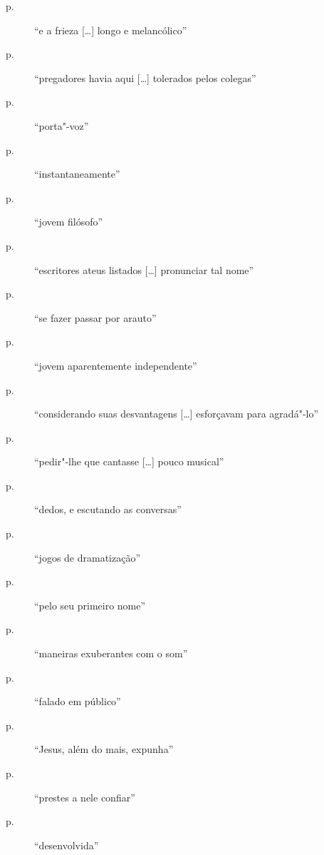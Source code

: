 \begin{description}
\item[p.~\pageref{e"-a}]  ``e a frieza [\ldots] longo e melancólico''

\item[p.~\pageref{pregadores"-havia}]  ``pregadores havia aqui [\ldots] tolerados pelos colegas''

\item[p.~\pageref{porta"-voz}]  ``porta"-voz''

\item[p.~\pageref{instantaneamente}]  ``instantaneamente''

\item[p.~\pageref{jovem"-filosofo}]  ``jovem filósofo''

\item[p.~\pageref{escritores"-ateus}]  ``escritores ateus listados [\ldots] pronunciar tal nome''

\item[p.~\pageref{se"-fazer}]  ``se fazer passar por arauto''

\item[p.~\pageref{jovem"-aparentemente}]  ``jovem aparentemente independente''

\item[p.~\pageref{considerando"-suas}]  ``considerando suas desvantagens [\ldots] esforçavam para agradá"-lo''

\item[p.~\pageref{pedir"-lhe"-que}]  ``pedir"-lhe que cantasse [\ldots] pouco musical''

\item[p.~\pageref{dedos"-e}]  ``dedos, e escutando as conversas''

\item[p.~\pageref{jogos"-de}]  ``jogos de dramatização''

\item[p.~\pageref{pelo"-seu}]  ``pelo seu primeiro nome''

\item[p.~\pageref{maneiras"-exuberantes}]  ``maneiras exuberantes com o som''

\item[p.~\pageref{falado"-em}]  ``falado em público''

\item[p.~\pageref{jesus}]  ``Jesus, além do mais, expunha''

\item[p.~\pageref{prestes"-a}]  ``prestes a nele confiar''

\item[p.~\pageref{desenvolvida}]  ``desenvolvida''


\end{description}
